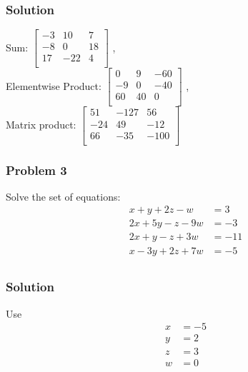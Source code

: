 \documentclass[14pt,compress]{beamer}
\newcounter{time}
\newcommand{\inctime}[1]{\addtocounter{time}{#1}{\tiny \thetime\ m}}
\newcommand{\kwrd}[1]{ \texttt{\textbf{\color{blue}{#1}}}  }
\begin{document}
\begin{frame}[fragile]
\frametitle{Solution}
Sum: 
$\begin{bmatrix}
-3 & 10 & 7 \\
-8 & 0 & 18 \\
17 & -22 & 4 \\
\end{bmatrix}$
,\\ Elementwise Product:
$\begin{bmatrix}
0 & 9 & -60 \\
-9 & 0 & -40 \\
60 & 40 & 0 \\
\end{bmatrix}$
,\\ Matrix product:
$\begin{bmatrix}
51 & -127 & 56 \\
-24 & 49 & -12 \\
66 & -35 & -100 \\
\end{bmatrix}$
\end{frame}

\begin{frame}[fragile]
\frametitle{Problem 3}
Solve the set of equations:
\begin{align*}
  x + y + 2z -w & = 3\\
  2x + 5y - z - 9w & = -3\\
  2x + y -z + 3w & = -11 \\
  x - 3y + 2z + 7w & = -5\\
\end{align*}
\inctime{10}
\end{frame}

\begin{frame}[fragile]
\frametitle{Solution}
Use \kwrd{solve()}
\begin{align*}
  x & = -5\\
  y & = 2\\
  z & = 3\\
  w & = 0\\
\end{align*}
\end{frame}
\end{document}

